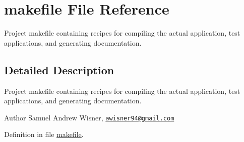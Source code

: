 \hypertarget{makefile}{\section{makefile File Reference}
\label{makefile}
}


Project makefile containing recipes for compiling the actual application, test applications, and generating documentation.  




\subsection{Detailed Description}
Project makefile containing recipes for compiling the actual application, test applications, and generating documentation. 

\begin{DoxyAuthor}{Author}
Samuel Andrew Wisner, \href{mailto:awisner94@gmail.com}{\tt awisner94@gmail.\+com} 
\end{DoxyAuthor}


Definition in file \hyperlink{makefile_source}{makefile}.

